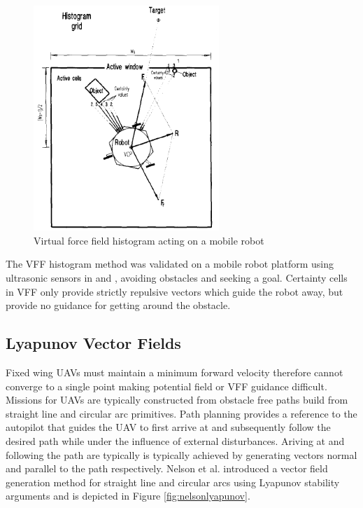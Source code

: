 \documentclass[numbered,pdftex]{ohio-etd}
\begin{document}
\begin{figure}
	\centering
	\includegraphics[width=7cm]{PaperFigures/histogram}
	\caption{Virtual force field histogram acting on a mobile robot}
	\label{fig:histogram}
\end{figure}


The VFF histogram method was validated on a mobile robot platform using ultrasonic sensors in \cite{borenstein_real-time_1990} and \cite{borenstein_vector_1991}, avoiding obstacles and seeking a goal. Certainty cells in VFF only provide strictly repulsive vectors which guide the robot away, but provide no guidance for getting around the obstacle. 

 

 
 
 

\subsection{Lyapunov Vector Fields}

Fixed wing UAVs must maintain a minimum forward velocity therefore cannot converge to a single point making potential field or VFF guidance difficult. Missions for UAVs are typically constructed from obstacle free paths build from straight line and circular arc primitives. Path planning provides a reference to the autopilot that guides the UAV to first arrive at and subsequently follow the desired path while under the influence of external disturbances. 
Ariving at and following the path are typically is typically achieved by generating vectors normal and parallel to the path respectively. Nelson et al. introduced a vector field generation method for straight line and circular arcs using Lyapunov stability arguments \cite{nelson_cooperative_2005} and is depicted in Figure \ref{fig:nelsonlyapunov}.
\end{document}
